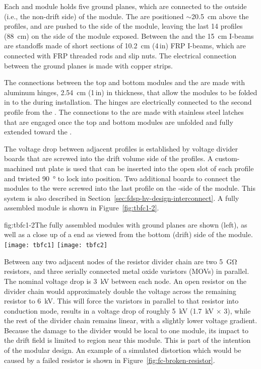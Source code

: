 Each  and  module holds five ground planes, which are connected to the outside (i.e., the non-drift side) of the module. The  are positioned $\sim$\SI{20.5}{\cm} above the profiles, and are pushed to the  side of the module, leaving the last 14 profiles (\SI{88}{\cm}) on the  side of the module exposed. Between the  and the \SI{15}{\cm} I-beams are standoffs made of short sections of \SI{10.2}{\cm} (4\,in)  FRP I-beams, which are connected with FRP threaded rods and slip nuts. The electrical connection between the ground planes is made with copper strips.

The connections between the top and bottom modules and the  are made with aluminum hinges, \SI{2.54}{\cm} (1\,in) in thickness, that allow the modules to be folded in to the  during installation. The hinges are electrically connected to the second profile from the . The connections to the  are made with stainless steel latches that are engaged once the top and bottom modules are unfolded and fully extended toward the .

The voltage drop between adjacent profiles is established by voltage divider boards that are screwed into the drift volume side of the profiles. A custom-machined nut plate is used that can be inserted into the open slot of each profile and twisted \SI{90}{\degree} %
to lock into position. Two additional boards to connect the modules to the  were screwed into the last profile on the -side of the module. This system is also described in Section~\ref{sec:fdsp-hv-design-interconnect}. A fully assembled module is shown in Figure~\ref{fig:tbfc1-2}.

\begin{dunefigure}{fig:tbfc1-2}{The fully assembled modules with ground planes are shown (left), as well as a close up of a  end as viewed from the bottom (drift) side of the module.}
\texttt{[image: tbfc1]}
\texttt{[image: tbfc2]}
\end{dunefigure}

Between any two adjacent nodes of the resistor divider chain are two \SI{5}{\giga\ohm} resistors, and three serially connected metal oxide varistors (MOVs) in parallel.  The nominal voltage drop is \SI{3}{kV} between each node.
An open resistor on the divider chain would approximately double the voltage across the remaining resistor to \SI{6}{kV}.  This will force the varistors in parallel to that resistor into conduction mode, results in a voltage drop of roughly \SI{5}{kV} (\SI{1.7}{kV} $\times$ \num{3}), while the rest of the divider chain remains linear, with a slightly lower voltage gradient.
Because the damage to the divider would be local to one module, its impact to the  drift field is limited to region near this module.  This is part of the intention of the modular design.
An example of a simulated \efield{} distortion which would be caused by a failed resistor is shown in Figure~\ref{fig:fc-broken-resistor}. 


